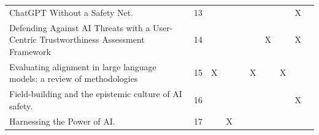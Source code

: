 \begin{landscape}
\begin{longtable}{|p{17cm}|c|c|c|c|c|c|c|c|c|}
		ChatGPT Without a Safety Net.                                                                                                                           & 13          &                                    &                                                           &                                                       &                                                            &                                           &                                              & X                                                  &                                    \\
		Defending Against AI Threats with a User-Centric Trustworthiness Assessment Framework                                                                   & 14          &                                    &                                                           &                                                       &                                                            & X                                         &                                              & X                                                  &                                    \\
		Evaluating alignment in large language models: a review of methodologies                                                                                & 15          & X                                  &                                                           &                                                       & X                                                          &                                           & X                                            &                                                    &                                    \\
		Field-building and the epistemic culture of AI safety.                                                                                                  & 16          &                                    &                                                           &                                                       &                                                            &                                           &                                              & X                                                  &                                    \\
		Harnessing the Power of AI.                                                                                                                             & 17          &                                    & X                                                         &                                                       &                                                            &                                           &                                              &                                                    &                                    \\

\end{longtable}
\end{landscape}
